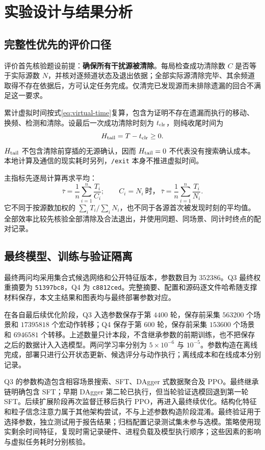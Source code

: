 \section{实验设计与结果分析}

\subsection{完整性优先的评价口径}
评价首先核验题设前提：\textbf{确保所有干扰源被清除}。每局检查成功清除数 $C$ 是否等于实际源数 $N$，并核对逐频道状态及退出依据；全部实际源清除完毕、其余频道取得不存在依据后，方可认定任务完成。仅清完已发现源而未排除遗漏的回合不满足这一要求。

累计虚拟时间按式\eqref{eq:virtual-time}复算，包含为证明不存在遗漏而执行的移动、换频、检测和清除。设最后一次成功清除时刻为 $t_{\rm clr}$，则纯收尾时间为
\begin{equation}
 H_{\rm tail}=T-t_{\rm clr}\geq0.
\end{equation}
$H_{\rm tail}$ 不包含清除前穿插的无源确认，因而 $H_{\rm tail}=0$ 不代表没有搜索确认成本。本地计算及通信的现实耗时另列，\texttt{/exit} 本身不推进虚拟时间。

主指标先逐局计算再求平均：
\begin{equation}
 \bar\tau=\frac1n\sum_{i=1}^n\frac{T_i}{C_i};\qquad C_i=N_i\ \text{时，}\ \bar\tau=\frac1n\sum_{i=1}^n\frac{T_i}{N_i}.
\end{equation}
它不同于按源数加权的 $\sum_iT_i/\sum_iN_i$，也不同于各源首次被发现时刻的平均值。全部效率比较先核验全部清除及合法退出，并使用同题、同场景、同计时终点的配对记录。

\subsection{最终模型、训练与验证隔离}
最终两问均采用集合式候选网络和公开特征版本，参数数目为 $352386$。Q3 最终权重摘要为 \texttt{51397bc8}，Q4 为 \texttt{c8812ced}。完整摘要、配置和源码逐文件哈希随支撑材料保存，本文主结果和图表均与最终部署参数对应。

在各自最后续优化阶段，Q3 入选参数保存于第 $4400$ 轮，保存前采集 $563200$ 个场景和 $17395818$ 个宏动作转移；Q4 保存于第 $600$ 轮，保存前采集 $153600$ 个场景和 $6946581$ 个转移。上述数量只计本段，不含继承参数的前期训练，也不把保存之后的数据计入入选模型。两问学习率分别为 $5\times10^{-6}$ 与 $10^{-5}$。参数构造在离线完成，部署只进行公开状态更新、候选评分与动作执行；离线成本和在线成本分别记录。

Q3 的参数构造包含相容场景搜索、SFT、DAgger 式数据聚合及 PPO。最终继承链明确包含 SFT；早期 DAgger 第二轮已执行，但当轮验证选模回退到第一轮 SFT。后续扩展阶段再次监督迁移后执行 PPO，再进入最终续优化。结构化特征和粒子信念注意力属于其他架构尝试，不与上述参数构造阶段混淆。最终验证用于选择参数，独立测试用于报告结果；归档配置记录测试集未参与选模。策略使用现实剩余时间特征，复现时需记录硬件、进程负载及模型执行顺序；这些因素的影响与虚拟任务耗时分别核验。

